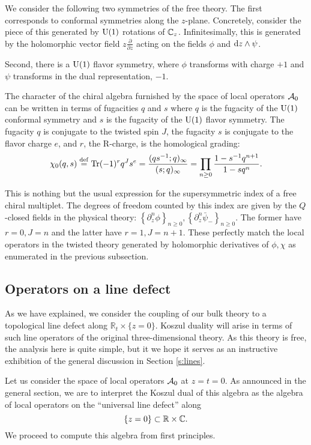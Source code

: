 \documentclass[11pt]{amsart}
\begin{document}
We consider the following two symmetries of the free theory.
The first corresponds to conformal symmetries along the $z$-plane. 
Concretely, consider the piece of this generated by ${\rm U}(1)$ rotations of $\mathbb C_z$.
Infinitesimally, this is generated by the holomorphic vector field $z \frac{\partial}{\partial z}$ acting on the fields $\phi$ and ${\rm d} z \wedge \psi$. 

Second, there is a ${\rm U}(1)$ flavor symmetry, where $\phi$ transforms with charge $+1$ and $\psi$ transforms in the dual representation, $-1$.

The character of the chiral algebra furnished by the space of local operators $\mathcal A_0$ can be written in terms of fugacities $q$ and $s$ where $q$ is the fugacity of the ${\rm U}(1)$ conformal symmetry and $s$ is the fugacity of the ${\rm U}(1)$ flavor symmetry. The fugacity $q$ is conjugate to the twisted spin $J$, the fugacity $s$ is conjugate to the flavor charge $e$, and $r$, the R-charge, is the homological grading:
\[
\chi_0(q , s) \overset{\rm def}{=} \operatorname{Tr} (-1)^r q^J s^e =  \frac{(q s^{-1} ; q)_\infty}{(s ; q)_\infty}  = \prod_{n \geq 0} \frac{1 - s^{-1} q^{n+1}}{1 - s q^n}.
\]

This is nothing but the usual expression for the supersymmetric index of a free chiral multiplet. The degrees of freedom counted by this index are given by the $Q$-closed fields in the physical theory: $\left\lbrace \partial_z^n \phi \right\rbrace_{n \geq 0}, \left\lbrace \partial_z^n \bar{\psi}_- \right\rbrace_{n \geq 0}$. The former have $r=0, J = n$ and the latter have $r=1, J= n+1$. These perfectly match the local operators in the twisted theory generated by holomorphic derivatives of $\phi, \chi$ as enumerated in the previous subsection.

\subsection{Operators on a line defect}
As we have explained, we consider the coupling of our bulk theory to a topological line defect along $\mathbb{R}_t \times \{z=0\}$. 
Koszul duality will arise in terms of such line operators of the original three-dimensional theory. 
As this theory is free, the analysis here is quite simple, but it we hope it serves as an instructive exhibition of the general discussion in Section \ref{s:lines}. 

Let us consider the space of local operators $\mathcal A_0$ at $z=t=0$. 
As announced in the general section, we are to interpret the Koszul dual of this algebra as the algebra of local operators on the ``universal line defect'' along
\[
\{z=0\} \subset \mathbb R \times \mathbb C .
\]
We proceed to compute this algebra from first principles.  
\end{document}
